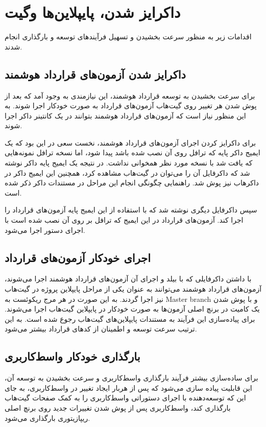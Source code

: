 \section{داکرایز شدن، پایپلاین‌ها وگیت}
اقدامات زیر به منظور سرعت بخشیدن و تسهیل فرآیندهای توسعه و بارگذاری انجام شدند.

\subsection{داکرایز شدن آزمون‌های قرارداد هوشمند}
برای سرعت بخشیدن به توسعه قرارداد هوشمند،
این نیازمندی به وجود آمد که بعد از پوش شدن هر تغییر روی گیت‌هاب آزمون‌های قرارداد به صورت خودکار اجرا شوند.
به این منظور نیاز است که آزمون‌های قرارداد هوشمند بتوانند در یک کانتینر داکر اجرا شوند.

برای داکرایز کردن اجرای آزمون‌های قرارداد هوشمند،
نخست سعی در این بود که یک ایمیج داکر پایه که ترافل روی آن نصب شده باشد پیدا شود،
اما نسخه ترافل نمونه‌هایی که یافت شد با نسخه مورد نظر همخوانی نداشت.
در نتیجه یک ایمیج پایه داکر نوشته شد که داکرفایل آن را می‌توان در گیت‌هاب
مشاهده کرد، همچنین این ایمیج داکر در داکرهاب
نیز پوش شد.
راهنمایی چگونگی انجام این مراحل در مستندات داکر
\cite{DockerDocs}
ذکر شده است.

سپس داکرفایل دیگری نوشته شد که با استفاده از این ایمیج پایه آزمون‌های قرارداد را اجرا کند.
آزمون‌های قرارداد در این ایمیج که ترافل بر روی آن نصب شده است با اجرای دستور
اجرا می‌شود.


\subsection{اجرای خودکار آزمون‌های قرارداد}
با داشتن داکرفایلی که با بیلد و اجرای آن آزمون‌های قرارداد هوشمند اجرا می‌شوند،
آزمون‌های قرارداد هوشمند می‌توانند به عنوان یکی از مراحل پایپلاین پروژه در گیت‌هاب نیز اجرا گردند.
به این صورت در هر مرج ریکوئست به
\gls{Master branch}
و با پوش شدن یک کامیت در برنچ اصلی آزمون‌ها به صورت خودکار در پایپلاین گیت‌هاب اجرا می‌شوند.
برای پیاده‌سازی این فرآیند به مستندات پایپلاین‌های گیت‌هاب
\cite{GithubActions}
رجوع شده است.
به این ترتیب سرعت توسعه و اطمینان از کدهای قرارداد بیشتر می‌شود.


\subsection{بارگذاری خودکار واسط‌کاربری}
برای ساده‌سازی بیشتر فرآیند بارگذاری واسط‌کاربری و سرعت بخشیدن به توسعه آن،
این قابلیت پیاده سازی می‌شود که پس از هربار ایجاد تغییر در واسط‌کاربری،
به جای این که توسعه‌دهنده با اجرای دستوراتی واسط‌کاربری را به کمک صفحات گیت‌هاب بارگذاری کند،
واسط‌کاربری پس از پوش شدن تغییرات جدید روی برنچ اصلی ریپازیتوری بارگذاری می‌شود.


